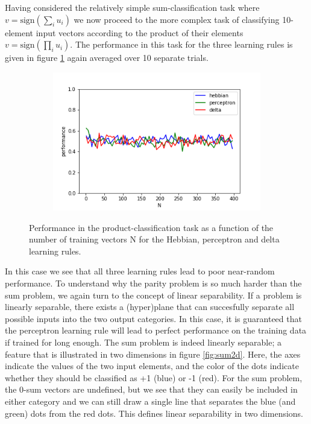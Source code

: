 \documentclass{article}
\begin{document}
Having considered the relatively simple sum-classification task where $v = \text{sign}(\sum_i{u_i})$ we now proceed to the more complex task of classifying 10-element input vectors according to the product of their elements $v = \text{sign}(\prod_i{u_i})$. The performance in this task for the three learning rules is given in figure \ref{fig:performance_prod} again averaged over 10 separate trials.

\begin{figure}[h]
	\centering
	\begin{subfigure}[t]{0.60\linewidth}
		\centering
		\includegraphics[width = 1.0\linewidth, trim={10 5 40 30}, clip=true]{figures/compare_prod.png}
	\end{subfigure}%
\caption{Performance in the product-classification task as a function of the number of training vectors N for the Hebbian, perceptron and delta learning rules.}
\label{fig:performance_prod}
\end{figure}

In this case we see that all three learning rules lead to poor near-random performance.
To understand why the parity problem is so much harder than the sum problem, we again turn to the concept of linear separability. If a problem is linearly separable, there exists a (hyper)plane that can succesfully separate all possible inputs into the two output categories. In this case, it is guaranteed that the perceptron learning rule will lead to perfect performance on the training data if trained for long enough.
The sum problem is indeed linearly separable; a feature that is illustrated in two dimensions in figure \ref{fig:sum2d}. Here, the axes indicate the values of the two input elements, and the color of the dots indicate whether they should be classified as +1 (blue) or -1 (red). For the sum problem, the 0-sum vectors are undefined, but we see that they can easily be included in either category and we can still draw a single line that separates the blue (and green) dots from the red dots. This defines linear separability in two dimensions.
\end{document}
